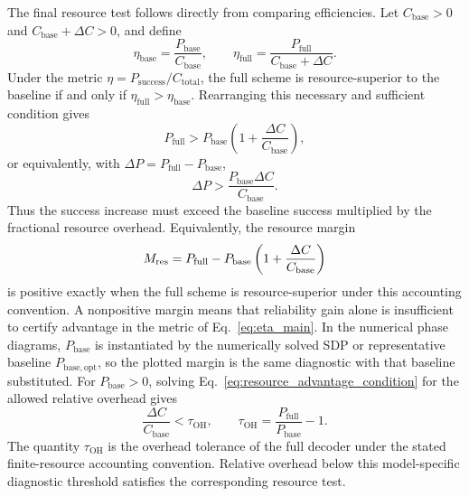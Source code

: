 \documentclass[
 reprint,
 amsmath,amssymb,
 aps,
 pra,
 floatfix,
]{revtex4-2}
\begin{document}
The final resource test follows directly from comparing efficiencies. Let $C_{\mathrm{base}}>0$ and $C_{\mathrm{base}}+\Delta C>0$, and define
\begin{equation}
    \eta_{\mathrm{base}}=\frac{P_{\mathrm{base}}}{C_{\mathrm{base}}},
    \qquad
    \eta_{\mathrm{full}}=\frac{P_{\mathrm{full}}}{C_{\mathrm{base}}+\Delta C}.
    \label{eq:eta_base_full_derivation}
\end{equation}
Under the metric \(\eta=P_{\mathrm{success}}/C_{\mathrm{total}}\), the full scheme is resource-superior to the baseline if and only if
\(\eta_{\mathrm{full}}>\eta_{\mathrm{base}}\). Rearranging this necessary and sufficient condition gives
\begin{equation}
    P_{\mathrm{full}}>P_{\mathrm{base}}\left(1+\frac{\Delta C}{C_{\mathrm{base}}}\right),
    \label{eq:resource_advantage_condition}
\end{equation}
or equivalently, with \(\Delta P=P_{\mathrm{full}}-P_{\mathrm{base}}\),
\begin{equation}
    \Delta P>\frac{P_{\mathrm{base}}\Delta C}{C_{\mathrm{base}}}.
    \label{eq:delta_p_resource_condition}
\end{equation}
Thus the success increase must exceed the baseline success multiplied by the fractional resource overhead.
Equivalently, the resource margin
\begin{equation}
    M_{\rm res}
    =
    P_{\mathrm{full}}
    -
    P_{\mathrm{base}}
    \left(1+\frac{\Delta C}{C_{\mathrm{base}}}\right)
    \label{eq:resource_margin_main}
\end{equation}
is positive exactly when the full scheme is resource-superior under this accounting convention. A nonpositive margin means that reliability gain alone is insufficient to certify advantage in the metric of Eq.~\eqref{eq:eta_main}. In the numerical phase diagrams, \(P_{\mathrm{base}}\) is instantiated by the numerically solved SDP or representative baseline \(P_{\mathrm{base,opt}}\), so the plotted margin is the same diagnostic with that baseline substituted.
For \(P_{\mathrm{base}}>0\), solving Eq.~\eqref{eq:resource_advantage_condition} for the allowed relative overhead gives
\begin{equation}
    \frac{\Delta C}{C_{\mathrm{base}}}
    <
    \tau_{\mathrm{OH}},
    \qquad
    \tau_{\mathrm{OH}}
    =
    \frac{P_{\mathrm{full}}}{P_{\mathrm{base}}}-1 .
    \label{eq:overhead_tolerance}
\end{equation}
The quantity \(\tau_{\mathrm{OH}}\) is the overhead tolerance of the full decoder under the stated finite-resource accounting convention. Relative overhead below this model-specific diagnostic threshold satisfies the corresponding resource test.
\end{document}

